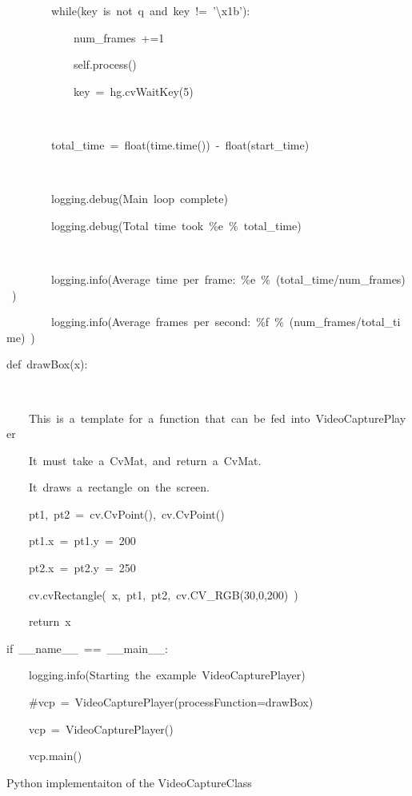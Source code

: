 \documentclass[english]{IEEEtran}
\theoremstyle{plain}
\newenvironment{lyxcode}
{\par\begin{list}{}{
\setlength{\rightmargin}{\leftmargin}
\setlength{\listparindent}{0pt}%
\raggedright
\setlength{\itemsep}{0pt}
\setlength{\parsep}{0pt}
\normalfont\ttfamily}%
 \item[]}
{\end{list}}
\begin{document}
\begin{algorithm*}
\begin{lyxcode}
~~~~~~~~while(key~is~not~\textquotedbl{}q\textquotedbl{}~and~key~!=~'\textbackslash{}x1b'):

~~~~~~~~~~~~num\_frames~+=1

~~~~~~~~~~~~self.process()

~~~~~~~~~~~~key~=~hg.cvWaitKey(5)

~~~~~~~~~~~~

~~~~~~~~total\_time~=~float(time.time())~-~float(start\_time)

~~~~~~~~

~~~~~~~~logging.debug(\textquotedbl{}Main~loop~complete\textquotedbl{})

~~~~~~~~logging.debug(\textquotedbl{}Total~time~took~\%e\textquotedbl{}~\%~total\_time)

~~~~~~~~

~~~~~~~~logging.info(\textquotedbl{}Average~time~per~frame:~\%e\textquotedbl{}~\%~(total\_time/num\_frames)~)

~~~~~~~~logging.info(\textquotedbl{}Average~frames~per~second:~\%f\textquotedbl{}~\%~(num\_frames/total\_time)~)



def~drawBox(x):

~~~~\textquotedbl{}\textquotedbl{}\textquotedbl{}

~~~~This~is~a~template~for~a~function~that~can~be~fed~into~VideoCapturePlayer

~~~~It~must~take~a~CvMat,~and~return~a~CvMat.

~~~~It~draws~a~rectangle~on~the~screen.\textquotedbl{}\textquotedbl{}\textquotedbl{}

~~~~pt1,~pt2~=~cv.CvPoint(),~cv.CvPoint()

~~~~pt1.x~=~pt1.y~=~200

~~~~pt2.x~=~pt2.y~=~250

~~~~cv.cvRectangle(~x,~pt1,~pt2,~cv.CV\_RGB(30,0,200)~)

~~~~return~x



if~\_\_name\_\_~==~\textquotedbl{}\_\_main\_\_\textquotedbl{}:

~~~~logging.info(\textquotedbl{}Starting~the~example~VideoCapturePlayer\textquotedbl{})

~~~~\#vcp~=~VideoCapturePlayer(processFunction=drawBox)

~~~~vcp~=~VideoCapturePlayer()

~~~~vcp.main()




\end{lyxcode}
\caption{Python implementaiton of the VideoCaptureClass}



\end{algorithm*}




\end{document}
